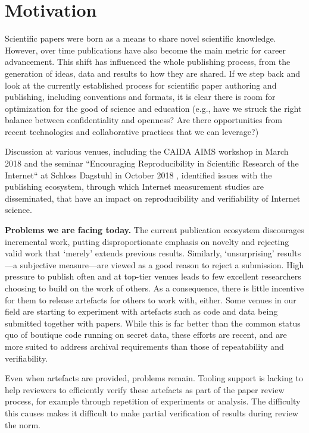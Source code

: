 \documentclass[sigconf]{acmart}
\begin{document}
\section{Motivation}
\label{sec:intro}

Scientific papers were born as a means to share novel scientific knowledge.
However, over time publications have also become the main metric for career
advancement. This shift has influenced the whole publishing process, from the
generation of ideas, data and results to how they are shared. If we step back
and look at the currently established process for scientific paper authoring and
publishing, including conventions and formats, it is clear there is room for
optimization for the good of science and education (e.g.,  have we struck the
right balance between confidentiality and openness? Are there opportunities from
recent technologies and collaborative practices that we can leverage?)

Discussion at various venues, including the CAIDA AIMS workshop in March 2018
\cite{aims-presentation} and the seminar ``Encouraging Reproducibility in
Scientific Research of the Internet`` at Schloss Dagstuhl in October 2018
\cite{dagstuhl-site}, identified issues with the publishing ecosystem, through
which Internet measurement studies are disseminated, that have an impact on
reproducibility and verifiability of Internet science.

\textbf{Problems we are facing today.} The current publication ecosystem
discourages incremental work, putting disproportionate emphasis on novelty and
rejecting valid work that `merely' extends previous results. Similarly,
`unsurprising' results---a subjective measure---are viewed as a good reason to
reject a submission. High pressure to publish often and at top-tier venues
leads to few excellent researchers choosing to build on the work of others. As
a consequence, there is little incentive for them to release artefacts for
others to work with, either. Some venues in our field are starting to
experiment with artefacts such as code and data being submitted together with
papers. While this is far better than the common status quo of boutique code
running on secret data, these efforts are recent, and are more suited to
address archival requirements than those of repeatability and verifiability. 

Even when artefacts are provided, problems remain. Tooling support is lacking
to help reviewers to efficiently verify these artefacts as part of the paper
review process, for example through repetition of experiments or analysis. The
difficulty this causes makes it difficult to make partial verification of
results during review the norm.
\end{document}
